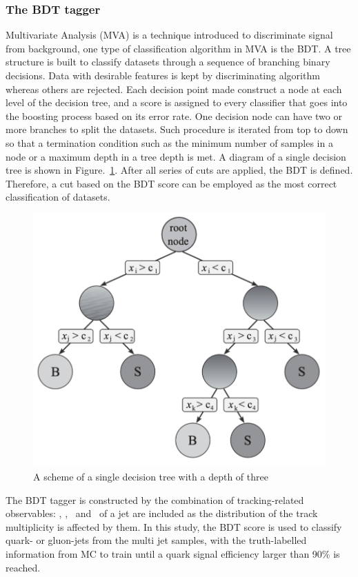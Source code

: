 \subsubsection{The BDT tagger}

Multivariate Analysis (MVA) is a technique introduced to discriminate signal from background, one type of classification algorithm in MVA is the BDT. A tree structure is built to classify datasets through a sequence of branching binary decisions. Data with desirable features is kept by discriminating algorithm whereas others are rejected. Each decision point made construct a node at each level of the decision tree, and a score is assigned to every classifier that goes into the boosting process based on its error rate. One decision node can have two or more branches to split the datasets. Such procedure is iterated from top to down so that a termination condition such as the minimum number of samples in a node or a maximum depth in a tree depth is met. A diagram of a single decision tree is shown in Figure.~\ref{Fig.bdt}. After all series of cuts are applied, the BDT is defined. Therefore, a cut based on the BDT score can be employed as the most correct classification of datasets.

\begin{figure}[htb] 
	\centering  
	\includegraphics[width=12cm]{./fig/bdt.png}
	\caption{A scheme of a single decision tree with a depth of three}
	\label{Fig.bdt}
\end{figure}

The BDT tagger is constructed by the combination of tracking-related observables: \ntrk, \wtrk, \cbeta~and \pt~of a jet are included as the distribution of the track multiplicity is affected by them. In this study, the BDT score is used to classify quark- or gluon-jets from the multi jet samples, with the truth-labelled information from MC to train until a quark signal efficiency larger than 90\% is reached.


